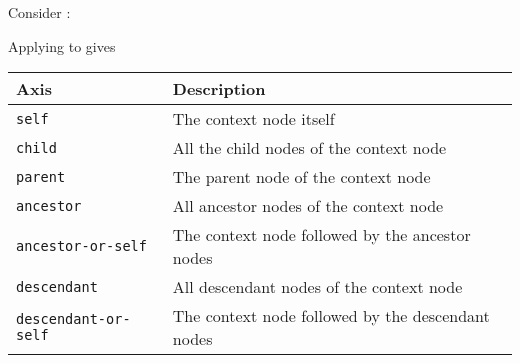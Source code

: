 %
\begin{slide}
 
\raggedslides[0pt]

Consider
:

\end{slide}


%
\begin{slide}
 
\raggedslides[0pt]

Applying 
to  gives
{\small}

\end{slide}


%
\begin{slide}
 
\raggedslides[0pt]

\begin{center}
\begin{tabular}{ll}
\toprule
Axis & Description\\
\midrule
\texttt{self}       & The context node itself\\
\texttt{child}      & All the child nodes of the context node\\
\texttt{parent}     & The parent node of the context node\\
\texttt{ancestor}   & All ancestor nodes of the context node\\
\texttt{ancestor-or-self} 
                    & The context node followed by the ancestor nodes\\
\texttt{descendant} & All descendant nodes of the context node\\
\texttt{descendant-or-self} 
                    & The context node followed by the descendant nodes\\
\bottomrule
\end{tabular}
\end{center}


\end{slide}


